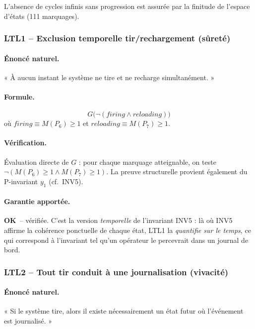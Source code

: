 \documentclass[11pt,a4paper]{article}
\newcommand{\OK}{\textcolor{green!50!black}{\textbf{OK}}}
\begin{document}
L'absence de cycles infinis sans progression est assurée par la finitude
de l'espace d'états (111 marquages).

\subsubsection*{LTL1 -- Exclusion temporelle tir/rechargement (sûreté)}

\paragraph{Énoncé naturel.}
« À aucun instant le système ne tire et ne recharge simultanément. »

\paragraph{Formule.}
\[
G\bigl(\neg(\textit{firing} \wedge \textit{reloading})\bigr)
\]
où $\textit{firing} \equiv M(P_6) \geq 1$ et
$\textit{reloading} \equiv M(P_7) \geq 1$.

\paragraph{Vérification.}
Évaluation directe de $G$ : pour chaque marquage atteignable, on teste
$\neg(M(P_6) \geq 1 \wedge M(P_7) \geq 1)$. La preuve structurelle
provient également du P-invariant $y_1$ (cf.\ INV5).

\paragraph{Garantie apportée.}
\OK\ -- vérifiée. C'est la version \emph{temporelle} de l'invariant INV5 :
là où INV5 affirme la cohérence ponctuelle de chaque état, LTL1 la
\emph{quantifie sur le temps}, ce qui correspond à l'invariant tel qu'un
opérateur le percevrait dans un journal de bord.

\subsubsection*{LTL2 -- Tout tir conduit à une journalisation (vivacité)}

\paragraph{Énoncé naturel.}
« Si le système tire, alors il existe nécessairement un état futur où
l'événement est journalisé. »
\end{document}
